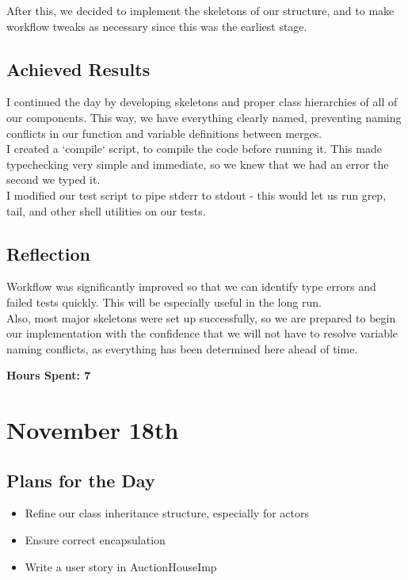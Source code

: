 \documentclass[titlepage, 12pt]{extarticle}
\begin{document}
After this, we decided to implement the skeletons of our structure, and to make
workflow tweaks as necessary since this was the earliest stage.\\

\subsection{Achieved Results}
I continued the day by developing skeletons and proper class hierarchies of all
of our components. This way, we have everything clearly named, preventing
naming conflicts in our function and variable definitions between merges.\\

I created a `compile` script, to compile the code before running it. This
made typechecking very simple and immediate, so we knew that we had an error
the second we typed it.\\

I modified our test script to pipe stderr to stdout - this would let us run
grep, tail, and other shell utilities on our tests.\\

\subsection{Reflection}
Workflow was significantly improved so that we can identify type errors and
failed tests quickly. This will be especially useful in the long run.\\

Also, most major skeletons were set up successfully, so we are prepared to
begin our implementation with the confidence that we will not have to resolve
variable naming conflicts, as everything has been determined here ahead of
time.

{\bf Hours Spent: 7}

\section{November 18th}
\subsection{Plans for the Day}
\begin{itemize}
    \item Refine our class inheritance structure, especially for actors
    \item Ensure correct encapsulation
    \item Write a user story in AuctionHouseImp
\end{itemize}
\end{document}
